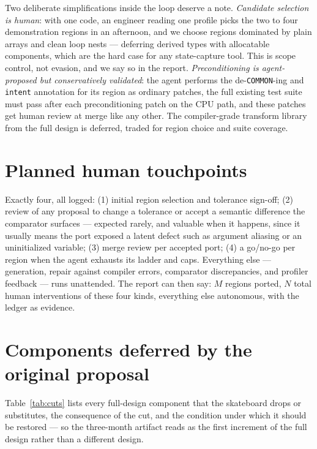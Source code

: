 \documentclass[11pt]{article}
\begin{document}
Two deliberate simplifications inside the loop deserve a note. \emph{Candidate selection is human}: with one code, an engineer reading one profile picks the two to four demonstration regions in an afternoon, and we choose regions dominated by plain arrays and clean loop nests --- deferring derived types with allocatable components, which are the hard case for any state-capture tool. This is scope control, not evasion, and we say so in the report. \emph{Preconditioning is agent-proposed but conservatively validated}: the agent performs the de-\texttt{COMMON}-ing and \texttt{intent} annotation for its region as ordinary patches, the full existing test suite must pass after each preconditioning patch on the CPU path, and these patches get human review at merge like any other. The compiler-grade transform library from the full design is deferred, traded for region choice and suite coverage.

\section{Planned human touchpoints}

Exactly four, all logged: (1) initial region selection and tolerance sign-off; (2) review of any proposal to change a tolerance or accept a semantic difference the comparator surfaces --- expected rarely, and valuable when it happens, since it usually means the port exposed a latent defect such as argument aliasing or an uninitialized variable; (3) merge review per accepted port; (4) a go/no-go per region when the agent exhausts its ladder and caps. Everything else --- generation, repair against compiler errors, comparator discrepancies, and profiler feedback --- runs unattended. The report can then say: $M$ regions ported, $N$ total human interventions of these four kinds, everything else autonomous, with the ledger as evidence.

\section{Components deferred by the original proposal}

Table~\ref{tab:cuts} lists every full-design component that the skateboard drops or substitutes, the consequence of the cut, and the condition under which it should be restored --- so the three-month artifact reads as the first increment of the full design rather than a different design.
\end{document}
